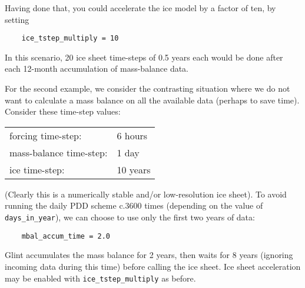 Having done that, you could accelerate the ice model by a factor of ten, by 
setting

\begin{verbatim}
    ice_tstep_multiply = 10
\end{verbatim}
%
In this scenario, 20 ice sheet time-steps of 0.5 years each would be done 
after each 12-month accumulation of mass-balance data.

For the second example, we consider the contrasting situation where we do not want to calculate a 
mass balance on all the available data (perhaps to save time). Consider 
these time-step values:

\vspace{0.5cm}
\begin{tabular}{ll}
forcing time-step:   &   6 hours \\
mass-balance time-step: & 1 day \\
ice time-step:       &   10 years\\
\end{tabular}
\vspace{0.5cm}
%
(Clearly this is a numerically stable and/or low-resolution ice sheet).
To avoid running the daily PDD scheme c.3600 times (depending on the value of 
\texttt{days\_in\_year}), we can choose to use only the first two years of data:

\begin{verbatim}
    mbal_accum_time = 2.0
\end{verbatim}
%
Glint accumulates the mass balance for 2 years, then waits for 8 years (ignoring incoming 
data during this time) before calling the ice sheet. Ice sheet 
acceleration may be enabled with \texttt{ice\_tstep\_multiply} as before.

%


